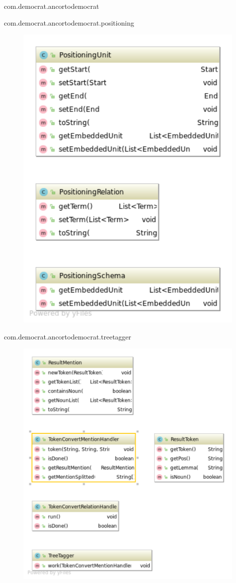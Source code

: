 \documentclass[a4paper,10pt]{report}
\begin{document}
\begin{section}{com.democrat.ancortodemocrat}
  \pagebreak
  \begin{subsection}{com.democrat.ancortodemocrat.positioning}  
     \begin{figure}[!htbp]      
\centering
      \includegraphics[width=0.7\linewidth, keepaspectratio]{Package_positioning.pdf}
     \end{figure}
     
  \end{subsection}  
  \pagebreak
  \begin{subsection}{com.democrat.ancortodemocrat.treetagger}  
     \begin{figure}[!htbp]      
      \centering
      \includegraphics[width=0.7\linewidth, keepaspectratio]{Package_treetagger.pdf}
     \end{figure}
     \vfill
  \end{subsection}
 \end{section}
 
\end{document}
